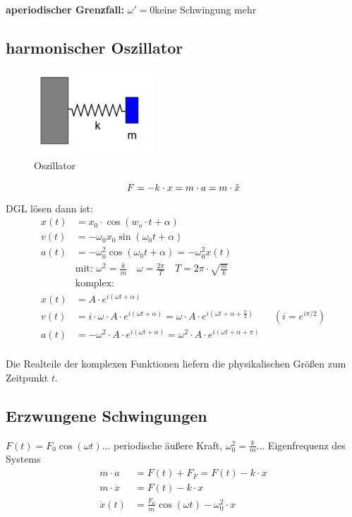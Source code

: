 \textbf{aperiodischer Grenzfall:} $\omega'=0$\qquad keine Schwingung mehr

\subsection{harmonischer Oszillator}
\begin{figure}
    \captionsetup{type=figure}
    \includegraphics[width=4.5cm]{pictures/Oszillator.png}
    \caption{Oszillator}\label{fig:Oszillator}
\end{figure}

\[ F = -k\cdot x = m\cdot a = m\cdot \ddot{x}\]
DGL lösen dann ist:
\begin{align*}
    x(t) &= x_0 \cdot \cos (w_o\cdot t + \alpha)\\
    v(t) &= -\omega_0 x_0 \sin(\omega_0t+\alpha)\\
    a(t) &= -\omega_0^2 \cos (\omega_0 t + \alpha) = -\omega_0^2 x(t)\\
    & \text{mit: } \omega^2 = \frac{k}{m} \quad \omega = \frac{2\pi}{T} \quad T=2\pi   \cdot \sqrt{\frac{m}{k}}\\
    & \text{komplex:}\\
    x(t)&= A\cdot e^{i(\omega t + \alpha)}\\
    v(t)&= i \cdot \omega \cdot A\cdot e^{i(\omega t + \alpha)} = \omega \cdot A\cdot e^{i(\omega t + \alpha + \frac{\pi}{2})}\qquad (i=e^{i \pi/2}) \\
    a(t)&= -\omega ^2 \cdot A\cdot e^{i(\omega t + \alpha)} = \omega ^2 \cdot A\cdot e^{i(\omega t + \alpha + \pi)}\\
\end{align*}

Die Realteile der komplexen Funktionen liefern die physikalischen Größen zum Zeitpunkt $t$.\\

\subsection{Erzwungene Schwingungen}
$F(t)=F_0\cos (\omega t)$... periodische äußere Kraft, $\omega_0^2=\frac{k}{m}$... Eigenfrequenz des Systems
\begin{align*}
    m\cdot a &= F(t) + F_F = F(t) -k\cdot x\\
    m\cdot \ddot{x} &= F(t) - k\cdot x\\
    \ddot{x}(t)&=\frac{F_0}{m}\cos(\omega t)-\omega_0^2 \cdot x
\end{align*}

